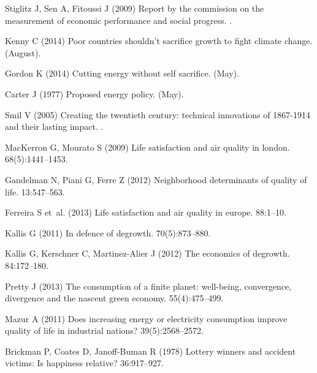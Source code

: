 \documentclass[10pt, letterpaper]{article}
\begin{document}
\begin{spacing}{1.4}
\begin{thebibliography}{10}
Stiglitz J, Sen A, Fitoussi J (2009) Report by the commission on the
  measurement of economic performance and social progress.
.

Kenny C (2014) Poor countries shouldn't sacrifice growth to fight climate
  change.
 (August).

Gordon K (2014) Cutting energy without self sacrifice.
 (May).

Carter J (1977) Proposed energy policy.
 (May).

Smil V (2005) Creating the twentieth century: technical innovations of
  1867-1914 and their lasting impact.
.

MacKerron G, Mourato S (2009) Life satisfaction and air quality in london.
 68(5):1441--1453.

Gandelman N, Piani G, Ferre Z (2012) Neighborhood determinants of quality of
  life.
 13:547--563.

Ferreira S et~al. (2013) Life satisfaction and air quality in europe.
 88:1--10.

Kallis G (2011) In defence of degrowth.
 70(5):873--880.

Kallis G, Kerschner C, Martinez-Alier J (2012) The economics of degrowth.
 84:172--180.

Pretty J (2013) The consumption of a finite planet: well-being, convergence,
  divergence and the nascent green economy.
 55(4):475--499.

Mazur A (2011) Does increasing energy or electricity consumption improve
  quality of life in industrial nations?
 39(5):2568--2572.

Brickman P, Coates D, Janoff-Buman R (1978) Lottery winners and accident
  victims: Is happiness relative?
 36:917--927.


\end{thebibliography}
\end{spacing}
\end{document}
